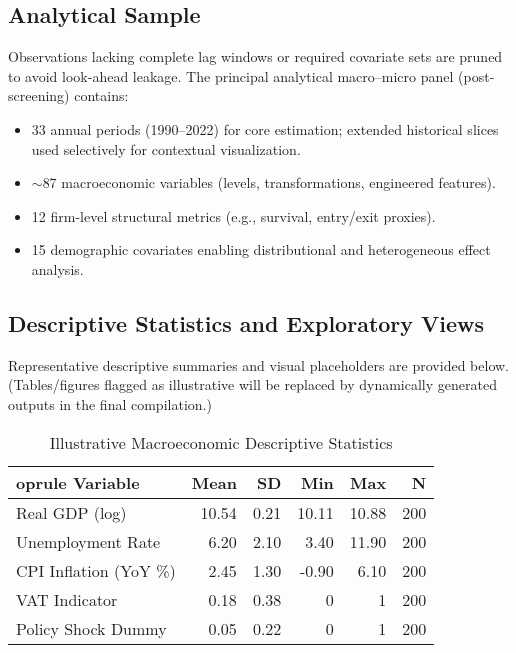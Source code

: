 \subsection{Analytical Sample}\label{subsec:analytical_sample}
Observations lacking complete lag windows or required covariate sets are pruned to avoid look-ahead leakage. The principal analytical macro--micro panel (post-screening) contains:
\begin{itemize}
  \item 33 annual periods (1990--2022) for core estimation; extended historical slices used selectively for contextual visualization.
  \item $\sim$87 macroeconomic variables (levels, transformations, engineered features).
  \item 12 firm-level structural metrics (e.g., survival, entry/exit proxies).
  \item 15 demographic covariates enabling distributional and heterogeneous effect analysis.
\end{itemize}

\subsection{Descriptive Statistics and Exploratory Views}\label{subsec:descriptive}
Representative descriptive summaries and visual placeholders are provided below. (Tables/figures flagged as illustrative will be replaced by dynamically generated outputs in the final compilation.)

\begin{table}[H]
  \centering
  \caption{Illustrative Macroeconomic Descriptive Statistics}\label{tab:macro_descriptive_placeholder}
  \begin{tabular}{lrrrrr}
    	oprule
  Variable & Mean & SD & Min & Max & N \\
  \midrule
  Real GDP (log) & 10.54 & 0.21 & 10.11 & 10.88 & 200 \\
  Unemployment Rate & 6.20 & 2.10 & 3.40 & 11.90 & 200 \\
  CPI Inflation (YoY \%) & 2.45 & 1.30 & -0.90 & 6.10 & 200 \\
  VAT Indicator & 0.18 & 0.38 & 0 & 1 & 200 \\
  Policy Shock Dummy & 0.05 & 0.22 & 0 & 1 & 200 \\
  \bottomrule
  \end{tabular}
\end{table}

